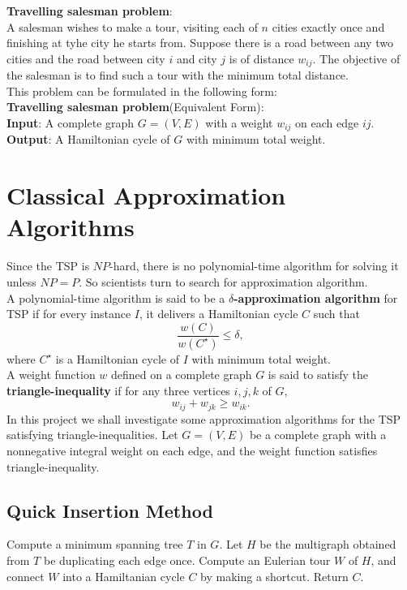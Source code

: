 \documentclass[12pt]{article}
\theoremstyle{remarkstyle}
\begin{document}
	
	
	
	
	

	\textbf{Travelling salesman problem}:\\
	A salesman wishes to make a tour, visiting each of $n$ cities exactly once and finishing at tyhe city he starts from. Suppose there is a road between any two cities and the road between city $i$ and city $j$ is of distance $w_{ij}$. The objective of the salesman is to find such a tour with the minimum total distance.\\
	This problem can be formulated in the following form:\\
	
	\noindent \textbf{Travelling salesman problem}(Equivalent Form):\\
	\textbf{Input}: A complete graph $G=(V,E)$ with a weight $w_{ij}$ on each edge $ij.$\\
	\textbf{Output}: A Hamiltonian cycle of $G$ with minimum total weight.
	
	\section{Classical Approximation Algorithms}
	Since the TSP is $NP$-hard, there is no polynomial-time algorithm for solving it unless $NP=P$. So scientists turn to search for approximation algorithm.\\
	A polynomial-time algorithm is said to be a \textbf{$\delta$-approximation algorithm} for TSP if for every instance $I$, it delivers a Hamiltonian cycle $C$ such that 
	$$\frac{w(C)}{w(C^\star)}\leq \delta,$$ 
	where $C^\star$ is a Hamiltonian cycle of $I$ with minimum total weight.\\
	A weight function $w$ defined on a complete graph $G$ is said to satisfy the \textbf{triangle-inequality} if for any three vertices $i,j,k$ of $G$, $$w_{ij}+w_{jk}\geq w_{ik}.$$ In this project we shall investigate some approximation algorithms for the TSP satisfying triangle-inequalities. Let $G=(V,E)$ be a complete graph with a nonnegative integral weight on each edge, and the weight function satisfies triangle-inequality.
	
	\subsection{Quick Insertion Method}
	\begin{algorithm}
		\caption{Quick Insertion Method}
		\begin{algorithmic}[1] %
			\State Compute a minimum spanning tree $T$ in $G$.
			\State Let $H$ be the multigraph obtained from $T$ be duplicating each edge once. Compute an Eulerian tour $W$ of $H$, and connect $W$ into a Hamiltanian cycle $C$ by making a shortcut. Return $C$.
			
		\end{algorithmic}
	\end{algorithm}
	
\end{document}
